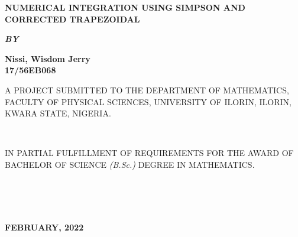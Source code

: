 \documentclass[12pt]{report}
\newcommand{\bt}[1]{\textbf{#1}}
\begin{document}
	
	\clearpage
	\thispagestyle{empty}
	\begin{center}
		\LARGE \bt{NUMERICAL INTEGRATION USING SIMPSON AND CORRECTED TRAPEZOIDAL}
	\end{center}

	\hspace{7cm}
	
	\begin{center}
		\textbf{\textit{BY}}
	\end{center}
	
	\hspace{5cm}
	
	\begin{center}
		\Large \textbf{Nissi, Wisdom Jerry
			\\
			17/56EB068}
	\end{center}
	
	\hspace{9cm}
	
	\begin{center}
		A PROJECT SUBMITTED TO THE DEPARTMENT OF MATHEMATICS, FACULTY OF PHYSICAL SCIENCES, UNIVERSITY OF ILORIN, ILORIN, KWARA STATE, NIGERIA.
	\end{center}

	\hspace{8cm} \\
	
	\begin{center}
		IN PARTIAL FULFILLMENT OF REQUIREMENTS FOR THE AWARD OF BACHELOR OF SCIENCE \textit{(B.Sc.)} DEGREE IN MATHEMATICS.
	\end{center}
	\hspace{5cm}
	\\ \\ \\
	\begin{center}
		\textbf{FEBRUARY, 2022}
	\end{center}

	\newpage
\end{document}
